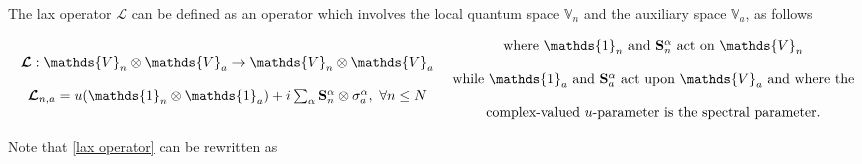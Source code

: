 \documentclass{homework}
\begin{document}
\begin{df}
   The lax operator $\bm{\mathcal{L}}$ can be defined as an operator which involves the local quantum space $\mathds{V}_n$ and the auxiliary space $\mathds{V}_a$, as follows 

\begin{equation}
    \begin{array}{c}
         \bm{\mathcal{L}} : \mathds{V}_n \otimes \mathds{V}_a \rightarrow \mathds{V}_n \otimes \mathds{V}_a \\
         \\
         \bm{\mathcal{L}}_{n, a} = u(\mathds{1}_n \otimes \mathds{1}_a) + i \sum_{\alpha} \spin_n^\alpha \otimes \sigma_{a}^\alpha, \blanky \forall n \leq N \\
    \end{array} \begin{array}{c}
         \textnormal{ where $\mathds{1}_n$ and $\spin_n^\alpha$ act on $\mathds{V}_n $} \\
         \\
         \textnormal{ while $\mathds{1}_a$ and $\spin_a^\alpha$ act upon $\mathds{V}_a$ and where the}\\
         \\
         \textnormal{ complex-valued $u$-parameter is the spectral parameter.}
    \end{array}
    \label{lax operator}
\end{equation}
\end{df}

 Note that \cref{lax operator} can be rewritten as 
\end{document}
